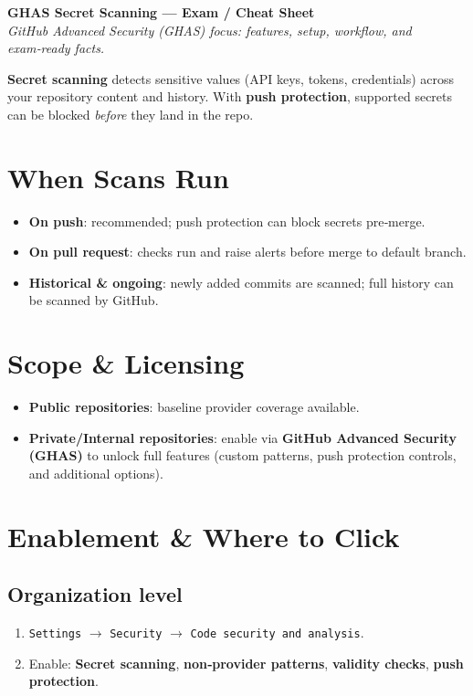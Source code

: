 \documentclass[11pt,a4paper]{article}
\newcommand{\kpi}[1]{\textbf{\textsf{#1}}}
\begin{document}
\begin{center}
{\LARGE\bfseries GHAS Secret Scanning — Exam / Cheat Sheet}\\[2pt]
{\small \textit{GitHub Advanced Security (GHAS) focus: features, setup, workflow, and exam‑ready facts.}}
\end{center}

\begin{ghascallout}[title=Core Idea]
\textbf{Secret scanning} detects sensitive values (API keys, tokens, credentials) across your repository content and history. With \textbf{push protection}, supported secrets can be blocked \emph{before} they land in the repo.
\end{ghascallout}

\section{When Scans Run}
\begin{itemize}
  \item \kpi{On push}: recommended; push protection can block secrets pre‑merge.
  \item \kpi{On pull request}: checks run and raise alerts before merge to default branch.
  \item \kpi{Historical \& ongoing}: newly added commits are scanned; full history can be scanned by GitHub.
\end{itemize}

\section{Scope \& Licensing}
\begin{itemize}
  \item \kpi{Public repositories}: baseline provider coverage available.
  \item \kpi{Private/Internal repositories}: enable via \kpi{GitHub Advanced Security (GHAS)} to unlock full features (custom patterns, push protection controls, and additional options).
\end{itemize}

\section{Enablement \& Where to Click}
\subsection*{Organization level}
\begin{enumerate}
  \item \texttt{Settings} $\rightarrow$ \texttt{Security} $\rightarrow$ \texttt{Code security and analysis}.
  \item Enable: \textbf{Secret scanning}, \textbf{non‑provider patterns}, \textbf{validity checks}, \textbf{push protection}.
\end{enumerate}
\end{document}

